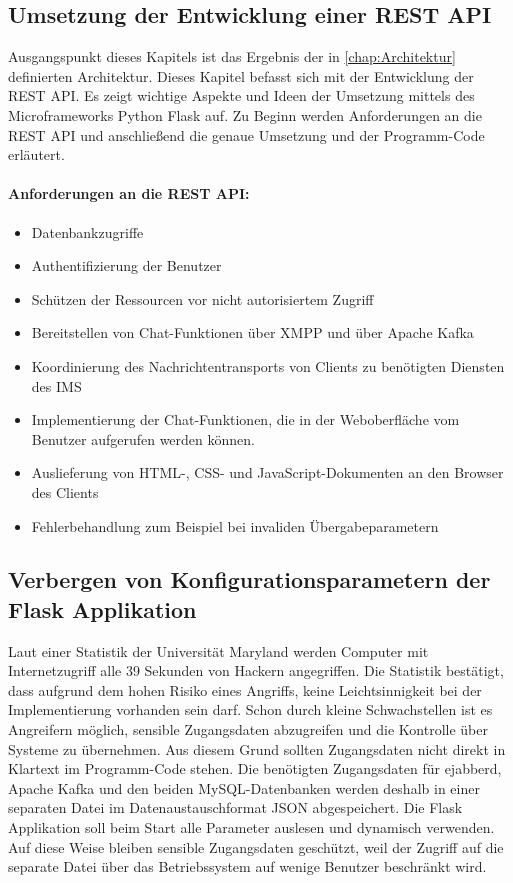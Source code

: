 \documentclass[a4paper,titlepage,halfparskip,12pt]{scrreprt}
\begin{document}
\begin{onehalfspacing}
\pagebreak

\chapter{Umsetzung der Entwicklung einer \acs{REST} \acs{API}}
\label{chap:Backend}

Ausgangspunkt dieses Kapitels ist das Ergebnis der in \autoref{chap:Architektur} definierten Architektur. Dieses Kapitel befasst sich mit der Entwicklung der \acs{REST} \acs{API}. Es zeigt wichtige Aspekte und Ideen der Umsetzung mittels des Microframeworks Python Flask auf. Zu Beginn werden Anforderungen an die \acs{REST} \acs{API} und anschließend die genaue Umsetzung und der Programm-Code erläutert.

\subsubsection*{Anforderungen an die \acs{REST} \acs{API}:}

\begin{itemize}
\item Datenbankzugriffe
\item Authentifizierung der Benutzer
\item Schützen der Ressourcen vor nicht autorisiertem Zugriff
\item Bereitstellen von Chat-Funktionen über \ac{XMPP} und über Apache Kafka
\item Koordinierung des Nachrichtentransports von Clients zu benötigten Diensten des \ac{IMS}
\item Implementierung der Chat-Funktionen, die in der Weboberfläche vom Benutzer aufgerufen werden können.
\item Auslieferung von \ac{HTML}-, \ac{CSS}- und JavaScript-Dokumenten an den Browser des Clients
\item Fehlerbehandlung zum Beispiel bei invaliden Übergabeparametern
\end{itemize}

\section{Verbergen von Konfigurationsparametern der Flask Applikation}

Laut einer Statistik der Universität Maryland \cite{securityStatisticWebSites} werden Computer mit Internetzugriff alle 39 Sekunden von Hackern angegriffen. Die Statistik bestätigt, dass aufgrund dem hohen Risiko eines Angriffs, keine Leichtsinnigkeit bei der Implementierung vorhanden sein darf. Schon durch kleine Schwachstellen ist es Angreifern möglich, sensible Zugangsdaten abzugreifen und die Kontrolle über Systeme zu übernehmen. Aus diesem Grund sollten Zugangsdaten nicht direkt in Klartext im Programm-Code stehen. Die benötigten Zugangsdaten für ejabberd, Apache Kafka und den beiden MySQL-Datenbanken werden deshalb in einer separaten Datei im Datenaustauschformat \acs{JSON} abgespeichert. Die Flask Applikation soll beim Start alle Parameter auslesen und dynamisch verwenden. Auf diese Weise bleiben sensible Zugangsdaten geschützt, weil der Zugriff auf die separate Datei über das Betriebssystem auf wenige Benutzer beschränkt wird.


\end{onehalfspacing}
\end{document}
